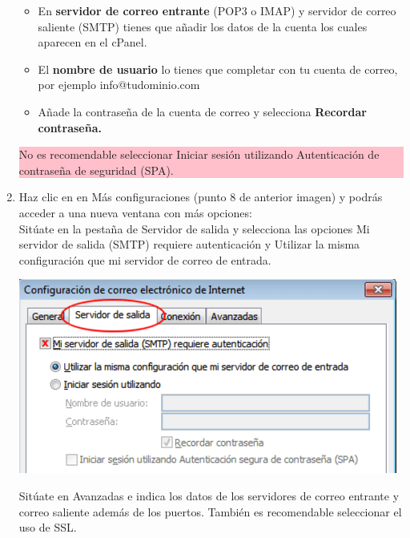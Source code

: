 \begin{enumerate}
\begin{itemize}
				\item En \textbf{servidor de correo entrante} (POP3 o IMAP) y servidor de correo saliente (SMTP) tienes que añadir los datos de la cuenta los cuales aparecen en el cPanel.
				
				\item El \textbf{nombre de usuario} lo tienes que completar con tu cuenta de correo, por ejemplo info@tudominio.com
				
				\item Añade la contraseña de la cuenta de correo y selecciona \textbf{Recordar contraseña.}
			\end{itemize}	
		
			\colorbox{pink}{\parbox{0.95\textwidth}{No es recomendable seleccionar Iniciar sesión utilizando Autenticación de contraseña de seguridad (SPA).}}
			
			\newpage
			
			\item Haz clic en en Más configuraciones (punto 8 de anterior imagen) y podrás acceder a una nueva ventana con más opciones: \\
			
			Sitúate en la pestaña de Servidor de salida y selecciona las opciones Mi servidor de salida (SMTP) requiere autenticación y Utilizar la misma configuración que mi servidor de correo de entrada.
			
			\begin{center}
				\includegraphics[scale=0.41]{image/outlook5.png}
			\end{center}


		
			Sitúate en Avanzadas e indica los datos de los servidores de correo entrante y correo saliente además de los puertos. También es recomendable seleccionar el uso de SSL.
			

\end{enumerate}
